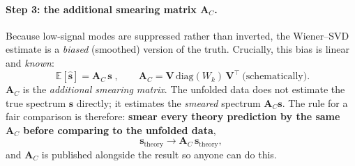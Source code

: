 \documentclass[11pt]{article}
\newcommand{\vs}{\mathbf{s}}
\newcommand{\shat}{\hat{\mathbf{s}}}
\newcommand{\AC}{\mathbf{A}_C}
\begin{document}
\paragraph{Step 3: the additional smearing matrix $\AC$.}
Because low-signal modes are suppressed rather than inverted, the Wiener--SVD estimate is
a \emph{biased} (smoothed) version of the truth. Crucially, this bias is linear and
\emph{known}:
\begin{equation}
  \boxed{\;\mathbb{E}[\shat] = \AC\,\vs\;}, \qquad
  \AC = \mathbf{V}\,\mathrm{diag}(W_k)\,\mathbf{V}^{\!\top}\ \text{(schematically).}
  \label{eq:ac}
\end{equation}
$\AC$ is the \emph{additional smearing matrix}. The unfolded data does not estimate the
true spectrum $\vs$ directly; it estimates the \emph{smeared} spectrum $\AC\vs$. The rule
for a fair comparison is therefore: \textbf{smear every theory prediction by the same
$\AC$ before comparing to the unfolded data},
\begin{equation}
  \vs_{\text{theory}} \longrightarrow \AC\,\vs_{\text{theory}},
\end{equation}
and $\AC$ is published alongside the result so anyone can do this.
\end{document}
